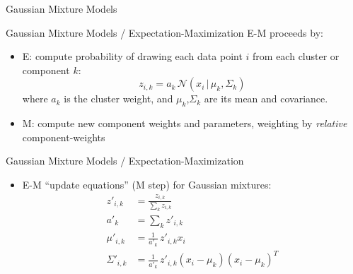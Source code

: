 \documentclass[compress,t]{beamer}
\begin{document}
\begin{frame}{Gaussian Mixture Models}
\begin{center}
  \end{center}
\end{frame}

\begin{frame}{Gaussian Mixture Models / Expectation-Maximization}
  E-M proceeds by:
  \begin{itemize}
  \item \alert{E}: compute probability of drawing each \alert{data
    point} $i$ from each \alert{cluster} or \alert{component} $k$:
    \[
    z_{i,k} = a_k \, \mathcal{N}(x_i \,|\, \mu_k, \Sigma_k)
    \]
  where $a_k$ is the cluster \alert{weight}, and $\mu_k$,$\Sigma_k$
  are its mean and covariance.
  \item \alert{M}: compute new component weights and parameters,
    weighting by \emph{relative} component-weights
  \end{itemize}
\end{frame}

\begin{frame}{Gaussian Mixture Models / Expectation-Maximization}
  \begin{itemize}
    \item E-M ``update equations'' (M step) for Gaussian mixtures:
      \begin{align}
        z'_{i,k} &= \frac{z_{i,k}}{\sum_k z_{i,k}} \\
        a'_k &= \sum_k z'_{i,k} \\
        \mu'_{i,k} &= \frac{1}{a'_k} \, z'_{i,k} x_i \\
        \Sigma'_{i,k} &= \frac{1}{a'_k} \, z'_{i,k} (x_i - \mu_k) (x_i - \mu_k)^T
      \end{align}
  \end{itemize}
\end{frame}
\end{document}
